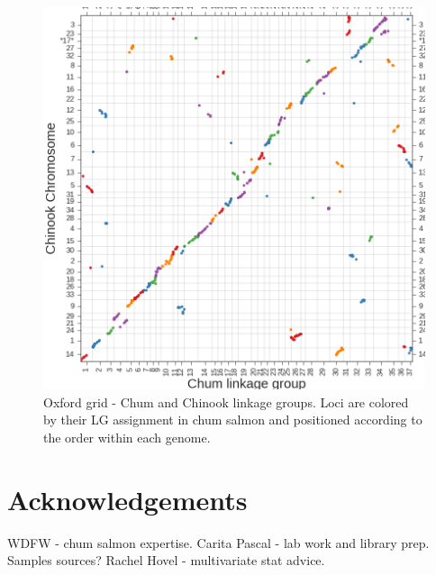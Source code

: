 \documentclass[12pt, one column]{article}
\begin{document}
\begin{figure}[H]
\includegraphics[scale=.35]{figures/supplemental/synteny_chinook.png}
\caption[SUPPLEMENTAL - Chum / Chinook Oxford grid]{Oxford grid - Chum and Chinook linkage groups. Loci are colored by their LG assignment in chum salmon and positioned according to the order within each genome.}
\end{figure}




\section*{Acknowledgements}
WDFW - chum salmon expertise.
Carita Pascal - lab work and library prep.
Samples sources?
Rachel Hovel - multivariate stat advice.
\end{document}
